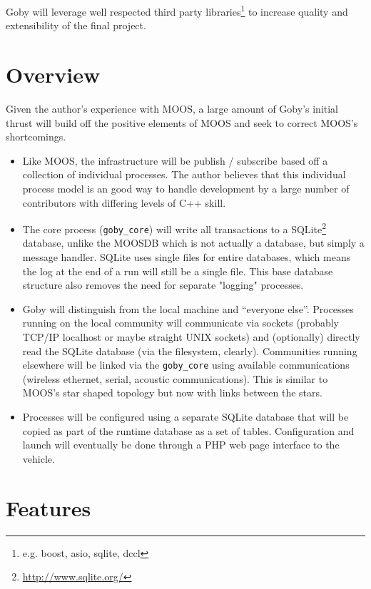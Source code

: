 \documentclass[10pt,letterpaper]{article}
\begin{document}
Goby will leverage well respected third party libraries\footnote{e.g. boost, asio, sqlite, dccl} to increase quality and extensibility of the final project. 

\section{Overview}

Given the author's experience with MOOS, a large amount of Goby's initial thrust will build off the positive elements of MOOS and seek to correct MOOS's shortcomings.

\begin{itemize}
\item Like MOOS, the infrastructure will be publish / subscribe based off a collection of individual processes. The author believes that this individual process model is an good way to handle development by a large number of contributors with differing levels of C++ skill.
\item The core process (\verb|goby_core|) will write all transactions to a SQLite\footnote{\url{http://www.sqlite.org/}} database, unlike the MOOSDB which is not actually a database, but simply a message handler. SQLite uses single files for entire databases, which means the log at the end of a run will still be a single file. This base database structure also removes the need for separate "logging" processes.
\item Goby will distinguish from the local machine and ``everyone else''. Processes running on the local community will communicate via sockets (probably TCP/IP localhost or maybe straight UNIX sockets) and (optionally) directly read the SQLite database (via the filesystem, clearly). Communities running elsewhere will be linked via the \verb|goby_core| using available communications (wireless ethernet, serial, acoustic communications). This is similar to MOOS's star shaped topology but now with links between the stars.
\item Processes will be configured using a separate SQLite database that will be copied as part of the runtime database as a set of tables. Configuration and launch will eventually be done through a PHP web page interface to the vehicle.
\end{itemize}

\section{Features}
\end{document}

